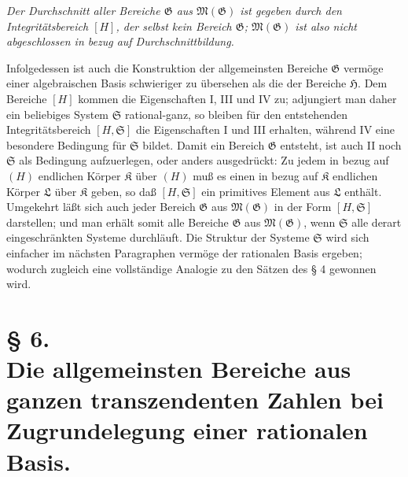 \emph{Der Durchschnitt aller Bereiche $\mathfrak G$ aus
$\mathfrak M(\mathfrak G)$ ist gegeben durch den Integritätsbereich $[H]$, der
selbst kein Bereich $\mathfrak G$; $\mathfrak M(\mathfrak G)$ ist also nicht
abgeschlossen in bezug auf Durchschnittbildung.}

Infolgedessen ist auch die Konstruktion der allgemeinsten Bereiche $\mathfrak G$
vermöge einer algebraischen Basis schwieriger zu übersehen als die der Bereiche
$\mathfrak H$. Dem Bereiche $[H]$ kommen die Eigenschaften I, III und IV zu;
adjungiert man daher ein beliebiges System $\mathfrak S$ rational-ganz, so
bleiben für den entstehenden Integritätsbereich $[H,\mathfrak S]$ die
Eigenschaften I und III erhalten, während IV eine besondere Bedingung für
$\mathfrak S$ bildet. Damit ein Bereich $\mathfrak G$ entsteht, ist auch II noch
$\mathfrak S$ als Bedingung aufzuerlegen, oder anders ausgedrückt: Zu jedem in
bezug auf $(H)$ endlichen
Körper $\mathfrak K$ über $(H)$ muß es einen in bezug auf $\mathfrak K$
endlichen Körper $\mathfrak L$ über $\mathfrak K$ geben, so daß
$[H,\mathfrak S]$ ein primitives Element aus $\mathfrak L$ enthält. Umgekehrt läßt sich auch jeder Bereich $\mathfrak G$ aus
$\mathfrak M(\mathfrak G)$ in der Form $[H,\mathfrak S]$ darstellen; und man
erhält somit alle Bereiche $\mathfrak G$ aus $\mathfrak M(\mathfrak G)$, wenn
$\mathfrak S$ alle derart eingeschränkten Systeme durchläuft. Die Struktur der
Systeme $\mathfrak S$ wird sich einfacher im nächsten Paragraphen vermöge der
\glqq{}rationalen Basis\grqq{} ergeben; wodurch zugleich eine vollständige Analogie zu den
Sätzen des § 4 gewonnen wird.

\section*{\centering § 6.\\[0.35em]
Die allgemeinsten Bereiche aus ganzen transzendenten Zahlen bei\\
Zugrundelegung einer rationalen Basis.}


